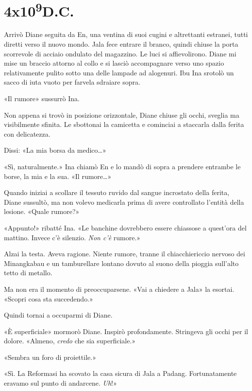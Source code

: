 \chapter{4x10\textsuperscript{9}D.C.}\label{4x10^9-6}

\hfill\break

Arrivò Diane seguita da En, una ventina di suoi cugini e altrettanti
estranei, tutti diretti verso il nuovo mondo. Jala fece entrare il
branco, quindi chiuse la porta scorrevole di acciaio ondulato del
magazzino. Le luci si affievolirono. Diane mi mise un braccio attorno al
collo e si lasciò accompagnare verso uno spazio relativamente pulito
sotto una delle lampade ad alogenuri. Ibu Ina srotolò un sacco di iuta
vuoto per farvela sdraiare sopra.

«Il rumore» sussurrò Ina.

Non appena si trovò in posizione orizzontale, Diane chiuse gli occhi,
sveglia ma visibilmente sfinita. Le sbottonai la camicetta e cominciai a
staccarla dalla ferita con delicatezza.

Dissi: «La mia borsa da medico\ldots»

«Sì, naturalmente.» Ina chiamò En e lo mandò di sopra a prendere
entrambe le borse, la mia e la sua. «Il rumore\ldots»

Quando iniziai a scollare il tessuto ruvido dal sangue incrostato della
ferita, Diane sussultò, ma non volevo medicarla prima di avere
controllato l'entità della lesione. «Quale rumore?»

«Appunto!» ribatté Ina. «Le banchine dovrebbero essere chiassose a
quest'ora del mattino. Invece c'è silenzio. \emph{Non c'è} rumore.»

Alzai la testa. Aveva ragione. Niente rumore, tranne il chiacchiericcio
nervoso dei Minangkabau e un tamburellare lontano dovuto al suono della
pioggia sull'alto tetto di metallo.

Ma non era il momento di preoccuparsene. «Vai a chiedere a Jala» la
esortai. «Scopri cosa sta succedendo.»

Quindi tornai a occuparmi di Diane.

\separatorefiori

«È superficiale» mormorò Diane. Inspirò profondamente. Stringeva gli
occhi per il dolore. «Almeno, \emph{credo} che sia superficiale.»

«Sembra un foro di proiettile.»

«Sì. La Reformasi ha scovato la casa sicura di Jala a Padang.
Fortunatamente eravamo sul punto di andarcene. \emph{Uh}!»

